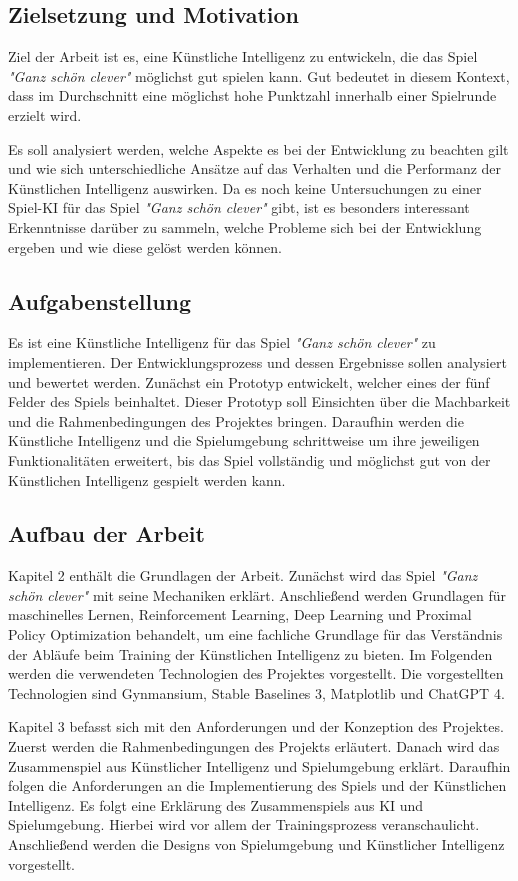 \newpage
\subsection{Zielsetzung und Motivation}
Ziel der Arbeit ist es, eine Künstliche Intelligenz zu entwickeln, die das Spiel \textit{"Ganz schön clever"} möglichst gut spielen kann. Gut bedeutet in diesem Kontext, dass im Durchschnitt eine möglichst hohe Punktzahl innerhalb einer Spielrunde erzielt wird. 

Es soll analysiert werden, welche Aspekte es bei der Entwicklung zu beachten gilt und wie sich unterschiedliche Ansätze auf das Verhalten und die Performanz der Künstlichen Intelligenz auswirken. Da es noch keine Untersuchungen zu einer Spiel-KI für das Spiel \textit{"Ganz schön clever"} gibt, ist es besonders interessant Erkenntnisse darüber zu sammeln, welche Probleme sich bei der Entwicklung ergeben und wie diese gelöst werden können.
\subsection{Aufgabenstellung}
Es ist eine Künstliche Intelligenz für das Spiel \textit{"Ganz schön clever"} zu implementieren. Der Entwicklungsprozess und dessen Ergebnisse sollen analysiert und bewertet werden. Zunächst ein Prototyp entwickelt, welcher eines der fünf Felder des Spiels beinhaltet. Dieser Prototyp soll Einsichten über die Machbarkeit und die Rahmenbedingungen des Projektes bringen. Daraufhin werden die Künstliche Intelligenz und die Spielumgebung schrittweise um ihre jeweiligen Funktionalitäten erweitert, bis das Spiel vollständig und möglichst gut von der Künstlichen Intelligenz gespielt werden kann.

\newpage
\subsection{Aufbau der Arbeit}
Kapitel 2 enthält die Grundlagen der Arbeit. Zunächst wird das Spiel \textit{"Ganz schön clever"} mit seine Mechaniken erklärt. Anschließend werden Grundlagen für maschinelles Lernen, Reinforcement Learning, Deep Learning und Proximal Policy Optimization behandelt, um eine fachliche Grundlage für das Verständnis der Abläufe beim Training der Künstlichen Intelligenz zu bieten. Im Folgenden werden die verwendeten Technologien des Projektes vorgestellt. Die vorgestellten Technologien sind Gynmansium, Stable Baselines 3, Matplotlib und ChatGPT 4.

Kapitel 3 befasst sich mit den Anforderungen und der Konzeption des Projektes. Zuerst werden die Rahmenbedingungen des Projekts erläutert. Danach wird das Zusammenspiel aus Künstlicher Intelligenz und Spielumgebung erklärt. Daraufhin folgen die Anforderungen an die Implementierung des Spiels und der Künstlichen Intelligenz. Es folgt eine Erklärung des Zusammenspiels aus KI und Spielumgebung. Hierbei wird vor allem der Trainingsprozess veranschaulicht. Anschließend werden die Designs von Spielumgebung und Künstlicher Intelligenz vorgestellt.

